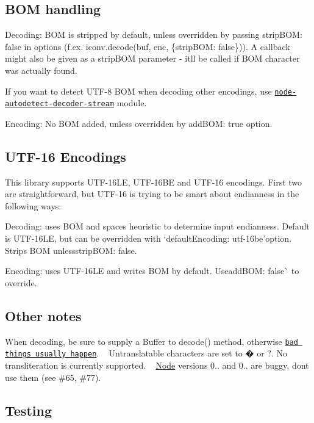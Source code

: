 \subsection*{B\+OM handling}


\begin{DoxyItemize}
\item Decoding\+: B\+OM is stripped by default, unless overridden by passing {\ttfamily strip\+B\+OM\+: false} in options (f.\+ex. {\ttfamily iconv.\+decode(buf, enc, \{strip\+B\+OM\+: false\})}). A callback might also be given as a {\ttfamily strip\+B\+OM} parameter -\/ it\textquotesingle{}ll be called if B\+OM character was actually found.
\item If you want to detect U\+T\+F-\/8 B\+OM when decoding other encodings, use \href{https://github.com/danielgindi/node-autodetect-decoder-stream}{\tt node-\/autodetect-\/decoder-\/stream} module.
\item Encoding\+: No B\+OM added, unless overridden by {\ttfamily add\+B\+OM\+: true} option.
\end{DoxyItemize}

\subsection*{U\+T\+F-\/16 Encodings}

This library supports U\+T\+F-\/16\+LE, U\+T\+F-\/16\+BE and U\+T\+F-\/16 encodings. First two are straightforward, but U\+T\+F-\/16 is trying to be smart about endianness in the following ways\+:
\begin{DoxyItemize}
\item Decoding\+: uses B\+OM and \textquotesingle{}spaces heuristic\textquotesingle{} to determine input endianness. Default is U\+T\+F-\/16\+LE, but can be overridden with `default\+Encoding\+: \textquotesingle{}utf-\/16be'{\ttfamily option. Strips B\+OM unless}strip\+B\+OM\+: false{\ttfamily .}
\item {\ttfamily Encoding\+: uses U\+T\+F-\/16\+LE and writes B\+OM by default. Use}add\+B\+OM\+: false\`{} to override.
\end{DoxyItemize}

\subsection*{Other notes}

When decoding, be sure to supply a Buffer to decode() method, otherwise \href{https://github.com/ashtuchkin/iconv-lite/wiki/Use-Buffers-when-decoding}{\tt bad things usually happen}. ~\newline
Untranslatable characters are set to � or ?. No transliteration is currently supported. ~\newline
\mbox{\hyperlink{classNode}{Node}} versions 0.. and 0.. are buggy, don\textquotesingle{}t use them (see \#65, \#77). ~\newline
 \subsection*{Testing}


 